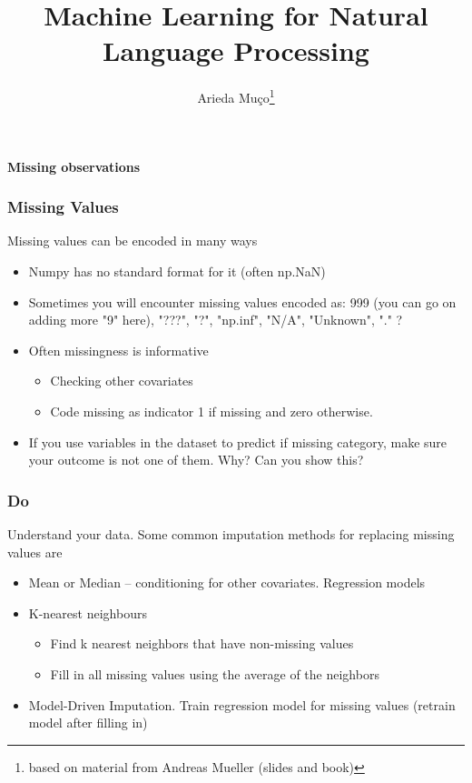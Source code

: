 \documentclass[compress, aspectratio=54]{beamer}
\title[ML for NLP ]{Machine Learning for Natural Language Processing}
\author[Arieda Mu\c co]{Arieda Mu\c co\footnote{based on material from Andreas Mueller (slides and book)}}
\institute[CEU]{Central European University}
\begin{document}
\captionsetup[subfigure]{labelformat=empty}

\frame{\titlepage}


\begin{frame}
\begin{center}
\Large{\textbf{Missing observations}}
\end{center}
\end{frame}

\begin{frame}
\frametitle{Missing Values}
Missing values can be encoded in many ways

\begin{itemize}
\item Numpy has no standard format for it (often np.NaN) 
\item Sometimes you will encounter missing values encoded as: 999 (you can go on adding more "9" here), "???", "?", "np.inf", "N/A", "Unknown", "." ?
\item Often missingness is informative
\begin{itemize}
\item Checking other covariates
\item Code missing as indicator 1 if missing and zero otherwise.
\end{itemize}
\item  If you use variables in the dataset to predict if missing category, make sure your outcome is not one of them. Why? Can you show this?
\end{itemize}

\end{frame}



\begin{frame}
\frametitle{Do }
Understand your data. Some common imputation methods for replacing missing values are
\begin{itemize}
\item Mean or Median -- conditioning for other covariates. Regression models

\item K-nearest neighbours
\begin{itemize}

\item  Find k nearest neighbors that have non-missing values

\item  Fill in all missing values using the average of the neighbors
\end{itemize}
\item Model-Driven Imputation. Train regression model for missing values (retrain model after filling in)


\end{itemize}
\end{frame}
\end{document}
